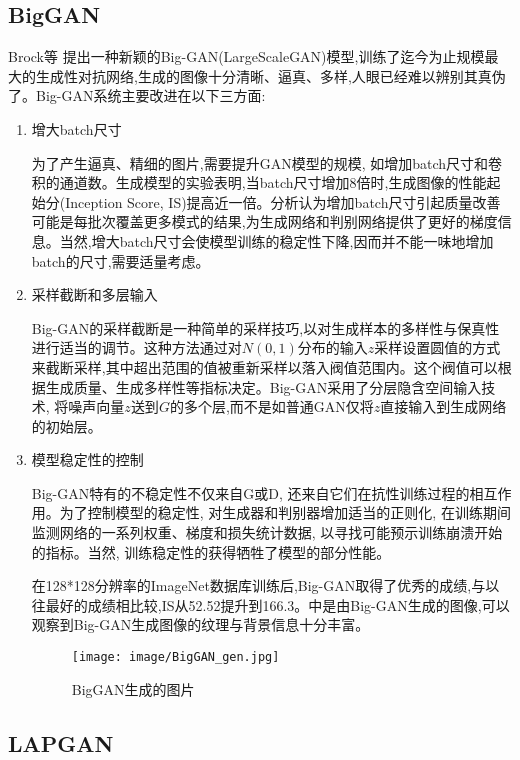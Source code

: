 \documentclass[lang=cn,a4paper,12pt,bibend=biber]{GAN}
\begin{document}
\subsection{BigGAN}

Brock等 提出一种新颖的Big-GAN(LargeScaleGAN)模型,训练了迄今为止规模最大的生成性对抗网络,生成的图像十分清晰、逼真、多样,人眼已经难以辨别其真伪了。Big-GAN系统主要改进在以下三方面:
\begin{enumerate}[方面 1.]
  \item 增大batch尺寸

        为了产生逼真、精细的图片,需要提升GAN模型的规模, 如增加batch尺寸和卷积的通道数。生成模型的实验表明,当batch尺寸增加8倍时,生成图像的性能起始分(Inception Score, IS)提高近一倍。分析认为增加batch尺寸引起质量改善可能是每批次覆盖更多模式的结果,为生成网络和判别网络提供了更好的梯度信息。当然,增大batch尺寸会使模型训练的稳定性下降,因而并不能一味地增加batch的尺寸,需要适量考虑。
  \item 采样截断和多层输入

        Big-GAN的采样截断是一种简单的采样技巧,以对生成样本的多样性与保真性进行适当的调节。这种方法通过对$N(0, 1)$分布的输入$z$采样设置圆值的方式来截断采样,其中超出范围的值被重新采样以落入阀值范围内。这个阀值可以根据生成质量、生成多样性等指标决定。Big-GAN采用了分层隐含空间输入技术, 将噪声向量$z$送到$G$的多个层,而不是如普通GAN仅将$z$直接输入到生成网络的初始层。
  \item 模型稳定性的控制

        Big-GAN特有的不稳定性不仅来自G或D, 还来自它们在抗性训练过程的相互作用。为了控制模型的稳定性, 对生成器和判别器增加适当的正则化, 在训练期间监测网络的一系列权重、梯度和损失统计数据, 以寻找可能预示训练崩溃开始的指标。当然, 训练稳定性的获得牺牲了模型的部分性能。

        在128*128分辨率的ImageNet数据库训练后,Big-GAN取得了优秀的成绩,与以往最好的成绩相比较,IS从52.52提升到166.3。中是由Big-GAN生成的图像,可以观察到Big-GAN生成图像的纹理与背景信息十分丰富。

        \begin{figure}[!htbp]
          \centering
          \texttt{[image: image/BigGAN\_gen.jpg]}
          \caption[]{BigGAN生成的图片}
          \label{fig:BigGAN生成的图片}
        \end{figure}
\end{enumerate}


\subsection{LAPGAN}
\end{document}
